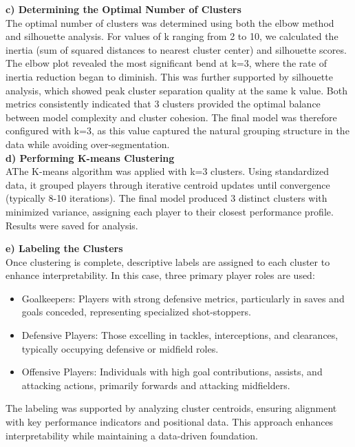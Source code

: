 \documentclass[a4paper,12pt]{article}
\begin{document}
\textbf{c) Determining the Optimal Number of Clusters} \\
The optimal number of clusters was determined using both the elbow method and silhouette analysis. For values of k ranging from 2 to 10, we calculated the inertia (sum of squared distances to nearest cluster center) and silhouette scores. The elbow plot revealed the most significant bend at k=3, where the rate of inertia reduction began to diminish. This was further supported by silhouette analysis, which showed peak cluster separation quality at the same k value. Both metrics consistently indicated that 3 clusters provided the optimal balance between model complexity and cluster cohesion. The final model was therefore configured with k=3, as this value captured the natural grouping structure in the data while avoiding over-segmentation.\\
\textbf{d) Performing K-means Clustering} \\
AThe K-means algorithm was applied with k=3 clusters. Using standardized data, it grouped players through iterative centroid updates until convergence (typically 8-10 iterations). The final model produced 3 distinct clusters with minimized variance, assigning each player to their closest performance profile. Results were saved for analysis.

\textbf{e) Labeling the Clusters} \\
Once clustering is complete, descriptive labels are assigned to each cluster to enhance interpretability. In this case, three primary player roles are used:
\begin{itemize}
    \item Goalkeepers: Players with strong defensive metrics, particularly in saves and goals conceded, representing specialized shot-stoppers.
    \item Defensive Players: Those excelling in tackles, interceptions, and clearances, typically occupying defensive or midfield roles.
    \item Offensive Players: 
    Individuals with high goal contributions, assists, and attacking actions, primarily forwards and attacking midfielders.
\end{itemize}
The labeling was supported by analyzing cluster centroids, ensuring alignment with key performance indicators and positional data. This approach enhances interpretability while maintaining a data-driven foundation.
\end{document}
